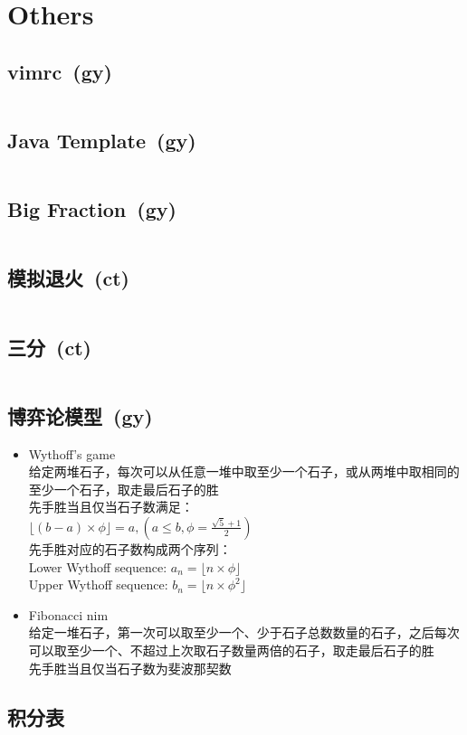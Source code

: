 \chapter{Others}
\section{vimrc\ \small(gy)}
\inputminted{vim}{Others/.vimrc}
\section{Java Template\ \small(gy)}
\inputminted{java}{Others/Template.java}
\section{Big Fraction\ \small(gy)}
\inputminted{kotlin}{Others/big_fraction.kt}
\section{模拟退火\ \small(ct)}
\inputminted{cpp}{Others/simulated_annealing.cpp}
\section{三分\ \small(ct)}
\inputminted{cpp}{Others/cubic_search.cpp}
\section{博弈论模型\ \small(gy)}
\begin{itemize}
	\item Wythoff's game\\给定两堆石子，每次可以从任意一堆中取至少一个石子，或从两堆中取相同的至少一个石子，取走最后石子的胜\\先手胜当且仅当石子数满足：\\$\lfloor (b - a) \times \phi \rfloor=a, (a \leq b, \phi = \frac{\sqrt{5} + 1}{2})$\\先手胜对应的石子数构成两个序列：\\Lower Wythoff sequence: $a_n = \lfloor n \times \phi \rfloor$\\Upper Wythoff sequence: $b_n = \lfloor n \times \phi ^ 2 \rfloor$
	\item Fibonacci nim\\给定一堆石子，第一次可以取至少一个、少于石子总数数量的石子，之后每次可以取至少一个、不超过上次取石子数量两倍的石子，取走最后石子的胜\\先手胜当且仅当石子数为斐波那契数
\end{itemize}
\section{积分表}